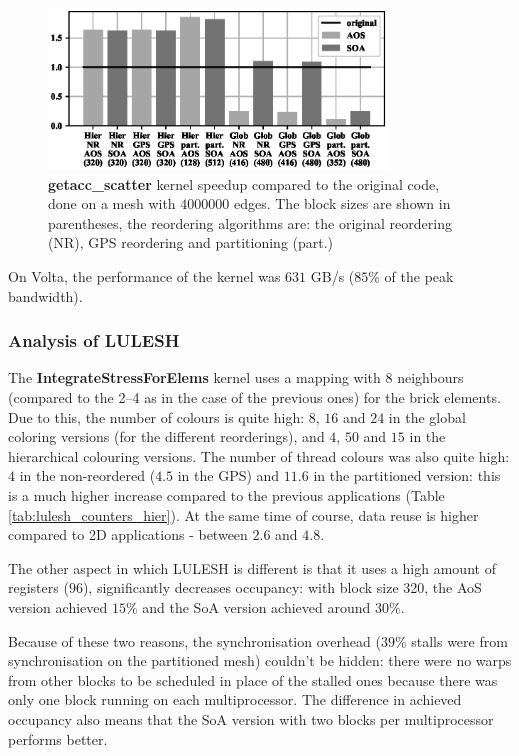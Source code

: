 \begin{figure}[Htbp]
  \centering
  \includegraphics[width=9cm]{fig/bookleaf_speedup.eps}
  \caption{\textbf{getacc\_scatter} kernel speedup compared to the original
  code, done on a mesh with $4000000$ edges. The block sizes are shown in
  parentheses, the reordering algorithms are: the original reordering (NR), GPS
  reordering and partitioning (part.)}
  \label{fig:bookleaf_speedup}
\end{figure}

On Volta, the performance of the kernel was $631$ GB/s ($85\%$ of the peak
bandwidth).

\subsubsection{Analysis of LULESH}\label{sec:analysis-of-lulesh}


The \textbf{IntegrateStressForElems} kernel uses a mapping with 8 neighbours
(compared to the 2--4 as in the case of the previous ones) for the brick
elements. Due to this, the number of colours is quite high: $8$, $16$ and $24$
in the global coloring versions (for the different reorderings), and $4$, $50$
and $15$ in the hierarchical colouring versions. The number of thread colours
was also quite high: $4$ in the non-reordered ($4.5$ in the GPS) and $11.6$ in
the partitioned version: this is a much higher increase compared to the previous
applications (Table \ref{tab:lulesh_counters_hier}). At the same time of course,
data reuse is higher compared to 2D applications - between $2.6$ and $4.8$.

The other aspect in which LULESH is different is that it uses a high amount of
registers ($96$), significantly decreases occupancy: with block size 320, the
AoS version achieved $15\%$ and the SoA version achieved around $30\%$.

Because of these two reasons, the synchronisation overhead ($39\%$ stalls were
from synchronisation on the partitioned mesh) couldn't be hidden: there were no
warps from other blocks to be scheduled in place of the stalled ones because
there was only one block running on each multiprocessor. The difference in
achieved occupancy also means that the SoA version with two blocks per
multiprocessor performs better.

